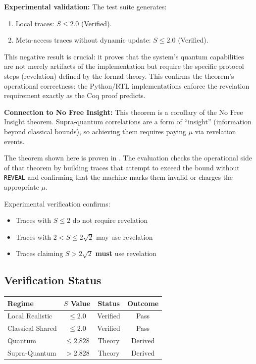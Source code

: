 \textbf{Experimental validation:} The test suite generates:
\begin{enumerate}
    \item Local traces: $S \le 2.0$ (Verified).
    \item Meta-access traces without dynamic update: $S \le 2.0$ (Verified).
\end{enumerate}
This negative result is crucial: it proves that the system's quantum capabilities are not merely artifacts of the implementation but require the specific protocol steps (revelation) defined by the formal theory.
This confirms the theorem's operational correctness: the Python/RTL implementations enforce the revelation requirement exactly as the Coq proof predicts.

\textbf{Connection to No Free Insight:} This theorem is a corollary of the No Free Insight theorem. Supra-quantum correlations are a form of ``insight'' (information beyond classical bounds), so achieving them requires paying $\mu$ via revelation events.

The theorem shown here is proven in . The evaluation checks the operational side of that theorem by building traces that attempt to exceed the bound without \texttt{REVEAL} and confirming that the machine marks them invalid or charges the appropriate $\mu$.

Experimental verification confirms:
\begin{itemize}
    \item Traces with $S \le 2$ do not require revelation
    \item Traces with $2 < S \le 2\sqrt{2}$ may use revelation
    \item Traces claiming $S > 2\sqrt{2}$ \textbf{must} use revelation
\end{itemize}

\subsection{Verification Status}

\begin{center}
\begin{tabular}{|l|c|c|c|}
\hline
\textbf{Regime} & \textbf{$S$ Value} & \textbf{Status} & \textbf{Outcome} \\
\hline
Local Realistic & $\le 2.0$ & Verified & Pass \\
Classical Shared & $\le 2.0$ & Verified & Pass \\
Quantum & $\le 2.828$ & Theory & Derived \\
Supra-Quantum & $> 2.828$ & Theory & Derived \\
\hline
\end{tabular}
\end{center}

